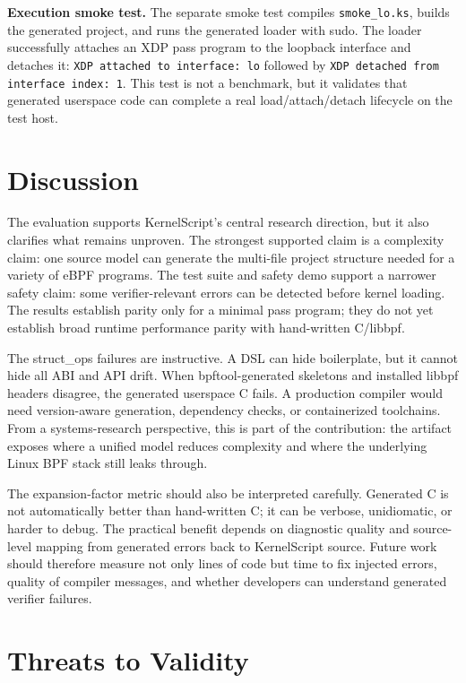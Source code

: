 \documentclass[10pt,twocolumn]{article}
\newcommand{\tool}{KernelScript}
\begin{document}
\textbf{Execution smoke test.}  The separate smoke test compiles
\texttt{smoke\_lo.ks}, builds the generated project, and runs the generated
loader with sudo.  The loader successfully attaches an XDP pass program to
the loopback interface and detaches it:
\texttt{XDP attached to interface: lo} followed by
\texttt{XDP detached from interface index: 1}.  This test is not a benchmark,
but it validates that generated userspace code can complete a real
load/attach/detach lifecycle on the test host.

\section{Discussion}

The evaluation supports \tool{}'s central research direction, but it also
clarifies what remains unproven.  The strongest supported claim is a
complexity claim: one source model can generate the multi-file project
structure needed for a variety of eBPF programs.  The test suite and safety
demo support a narrower safety claim: some verifier-relevant errors can be
detected before kernel loading.  The results establish parity only for a
minimal pass program; they do not yet establish broad runtime performance
parity with hand-written C/libbpf.

The struct\_ops failures are instructive.  A DSL can hide boilerplate, but it
cannot hide all ABI and API drift.  When bpftool-generated skeletons and
installed libbpf headers disagree, the generated userspace C fails.  A
production compiler would need version-aware generation, dependency checks, or
containerized toolchains.  From a systems-research perspective, this is part of
the contribution: the artifact exposes where a unified model reduces
complexity and where the underlying Linux BPF stack still leaks through.

The expansion-factor metric should also be interpreted carefully.  Generated
C is not automatically better than hand-written C; it can be verbose,
unidiomatic, or harder to debug.  The practical benefit depends on diagnostic
quality and source-level mapping from generated errors back to \tool{} source.
Future work should therefore measure not only lines of code but time to fix
injected errors, quality of compiler messages, and whether developers can
understand generated verifier failures.

\section{Threats to Validity}
\end{document}
